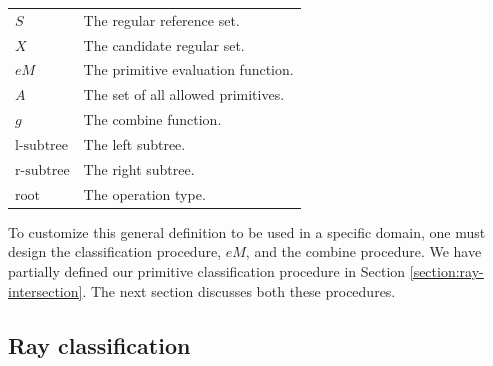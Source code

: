 \documentclass[a4paper,11pt,oneside]{article}
\makeatletter
\newenvironment{conditions}
  {\par\vspace{\abovedisplayskip}\noindent\begin{tabular}{>{$}l<{$} @{${}={}$} l}}
  {\end{tabular}\par\vspace{\belowdisplayskip}}
\makeatother
\begin{document}
\begin{conditions}
	S     				  &  The regular reference set. \\
	X     				  &  The candidate regular set. \\
	eM     	  &  The primitive evaluation function. \\
	A     			  	  &  The set of all allowed primitives. \\
	g     				  &  The combine function. \\
	\text{l-subtree}     &  The left subtree. \\
	\text{r-subtree}     &  The right subtree. \\
	\text{root}     	  &  The operation type. \footnotemark \\
\end{conditions}

To customize this general definition to be used in a specific domain, one must design the classification procedure, $eM$, and the combine procedure. We have partially defined our primitive classification procedure in Section \ref{section:ray-intersection}. The next section discusses both these procedures.

\subsection{Ray classification}
\label{sec3.3:ray-classification}
\end{document}
